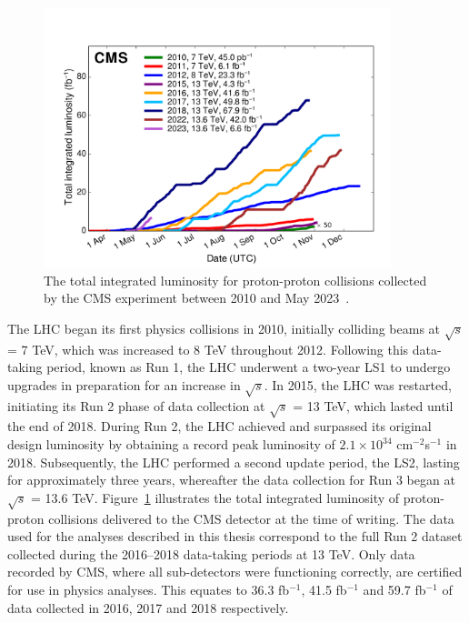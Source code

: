 \begin{figure}[h]
    \centering
    \includegraphics[width=0.9\textwidth]{Figures/int_lumi_cumulative_pp_2.pdf}
    \caption[Plot of the total integrated luminosity collected by the CMS experiment.]{The total integrated luminosity for proton-proton collisions collected by the \ac{CMS} experiment between 2010 and May 2023~\cite{lumi}.}
    \label{fig:int_lumi}
\end{figure}

The \ac{LHC} began its first physics collisions in 2010, initially colliding beams at $\sqrt{s}$ = 7 TeV, which was increased to 8 TeV throughout 2012. 
Following this data-taking period, known as Run 1, the \ac{LHC} underwent a two-year \ac{LS1} to undergo upgrades in preparation for an increase in $\sqrt{s}$. 
In 2015, the \ac{LHC} was restarted, initiating its Run 2 phase of data collection at $\sqrt{s}$ = 13 TeV, which lasted until the end of 2018. 
During Run 2, the \ac{LHC} achieved and surpassed its original design luminosity by obtaining a record peak luminosity of $2.1\times10^{34}$ cm$^{−2}$s$^{−1}$ in 2018.
Subsequently, the \ac{LHC} performed a second update period, the \ac{LS2}, lasting for approximately three years, whereafter the data collection for Run 3 began at $\sqrt{s}$ = 13.6 TeV.
Figure~\ref{fig:int_lumi} illustrates the total integrated luminosity of proton-proton collisions delivered to the \ac{CMS} detector at the time of writing.
The data used for the analyses described in this thesis correspond to the full Run 2 dataset collected during the 2016--2018 data-taking periods at 13 TeV. 
Only data recorded by \ac{CMS}, where all sub-detectors were functioning correctly, are certified for use in physics analyses. 
This equates to 36.3 fb$^{−1}$, 41.5 fb$^{−1}$ and 59.7 fb$^{-1}$ of data collected in 2016, 2017 and 2018 respectively. \\

